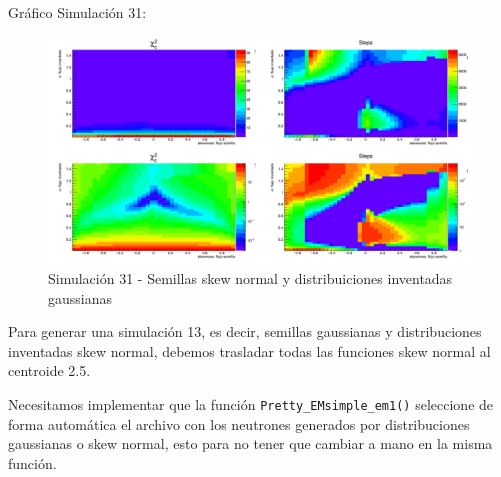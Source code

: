 \documentclass[11pt,letterpaper]{article}
\begin{document}
Gráfico Simulación 31:

\begin{figure}[H]
    \includegraphics[width=1.\textwidth]{img/plot_deconv_31_shift.png}
    \centering
     \cprotect\caption{Simulación 31 - Semillas skew normal y distribuiciones inventadas gaussianas} 
\label{plot_deconv_33_shift}
\end{figure}



Para generar una simulación 13, es decir, semillas gaussianas y distribuciones inventadas skew normal, debemos trasladar todas las funciones skew normal al centroide 2.5.

Necesitamos implementar que la función \verb|Pretty_EMsimple_em1()| seleccione de forma automática el archivo con los neutrones generados por distribuciones gaussianas o skew normal, esto para no tener que cambiar a mano en la misma función.




\clearpage
\appendix
\end{document}
